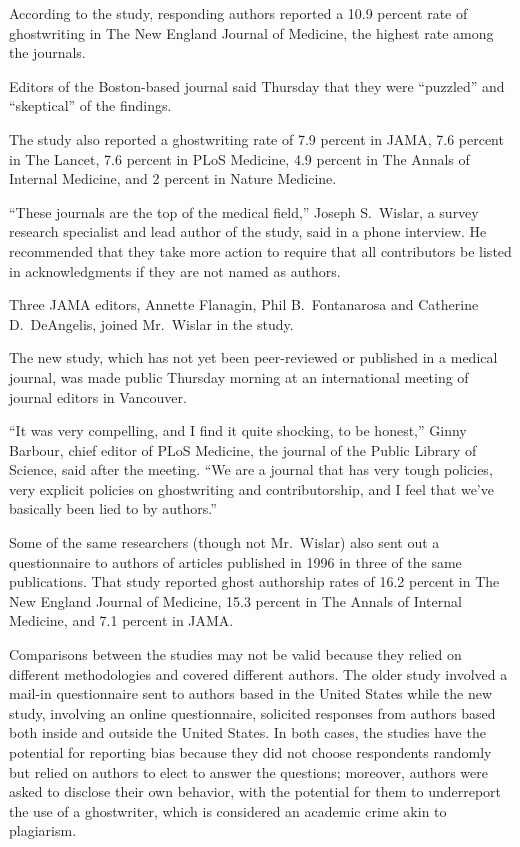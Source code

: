 ﻿\documentclass[12pt]{article}
\begin{document}
According to the study, responding authors reported a 10.9 percent rate of ghostwriting in The New
England Journal of Medicine, the highest rate among the journals.

Editors of the Boston-based journal said Thursday that they were ``puzzled'' and ``skeptical'' of
the findings.

The study also reported a ghostwriting rate of 7.9 percent in JAMA, 7.6 percent in The Lancet, 7.6
percent in PLoS Medicine, 4.9 percent in The Annals of Internal Medicine, and 2 percent in Nature
Medicine.

``These journals are the top of the medical field,'' Joseph S.~Wislar, a survey research specialist
and lead author of the study, said in a phone interview. He recommended that they take more action
to require that all contributors be listed in acknowledgments if they are not named as authors.

Three JAMA editors, Annette Flanagin, Phil B.~Fontanarosa and Catherine D.~DeAngelis, joined
Mr.~Wislar in the study.

The new study, which has not yet been peer-reviewed or published in a medical journal, was made
public Thursday morning at an international meeting of journal editors in Vancouver.

``It was very compelling, and I find it quite shocking, to be honest,'' Ginny Barbour, chief editor
of PLoS Medicine, the journal of the Public Library of Science, said after the meeting. ``We are a
journal that has very tough policies, very explicit policies on ghostwriting and contributorship,
and I feel that we've basically been lied to by authors.''

Some of the same researchers (though not Mr.~Wislar) also sent out a questionnaire to authors of
articles published in 1996 in three of the same publications. That study reported ghost authorship
rates of 16.2 percent in The New England Journal of Medicine, 15.3 percent in The Annals of Internal
Medicine, and 7.1 percent in JAMA.

Comparisons between the studies may not be valid because they relied on different methodologies and
covered different authors. The older study involved a mail-in questionnaire sent to authors based in
the United States while the new study, involving an online questionnaire, solicited responses from
authors based both inside and outside the United States. In both cases, the studies have the
potential for reporting bias because they did not choose respondents randomly but relied on authors
to elect to answer the questions; moreover, authors were asked to disclose their own behavior, with
the potential for them to underreport the use of a ghostwriter, which is considered an academic
crime akin to plagiarism.
\end{document}
